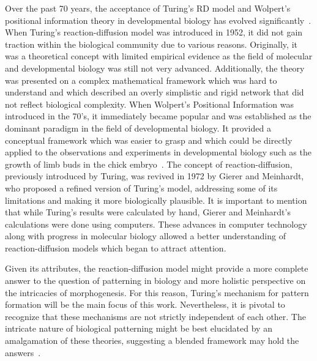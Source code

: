 Over the past 70 years, the acceptance of Turing's \acrfull{RD} model and Wolpert's positional information theory in developmental biology has evolved significantly~\parencite{green2015positional}.
When Turing's reaction-diffusion model was introduced in 1952, it did not gain traction within the biological community due to various reasons.
Originally, it was a theoretical concept with limited empirical evidence as the field of molecular and developmental biology was still not very advanced.
Additionally, the theory was presented on a complex mathematical framework which was hard to understand and which described an overly simplistic and rigid network that did not reflect biological complexity.
When Wolpert's Positional Information was introduced in the 70's, it immediately became popular and was established as the dominant paradigm in the field of developmental biology.
It provided a conceptual framework which was easier to grasp and which could be directly applied to the observations and experiments in developmental biology such as the growth of limb buds in the chick embryo~\parencite{saunders1968ectodermal}.
The concept of reaction-diffusion, previously introduced by Turing, was revived in 1972 by Gierer and Meinhardt, who proposed a refined version of Turing's model, addressing some of its limitations and making it more biologically plausible.
It is important to mention that while Turing's results were calculated by hand, Gierer and Meinhardt's calculations were done using computers.
These advances in computer technology along with progress in molecular biology allowed a better understanding of reaction-diffusion models which began to attract attention.

Given its attributes, the reaction-diffusion model might provide a more complete answer to the question of patterning in biology and more holistic perspective on the intricacies of morphogenesis.
For this reason, Turing's mechanism for pattern formation will be the main focus of this work.
Nevertheless, it is pivotal to recognize that these mechanisms are not strictly independent of each other.
The intricate nature of biological patterning might be best elucidated by an amalgamation of these theories, suggesting a blended framework may hold the answers~\parencite{Green2015}.



